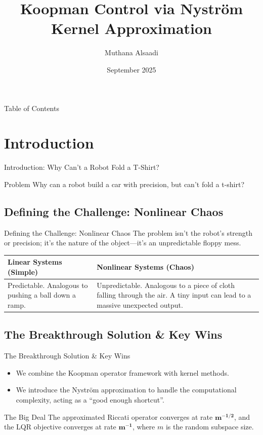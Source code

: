 \documentclass{beamer}
\title{Koopman Control via Nyström Kernel Approximation}
\author{Muthana Alsaadi}
\institute[University of Al-Nahrain]{College of Information Engineering\\University of Al-Nahrain}
\date{September 2025}
\begin{document}
\frame{\titlepage}

\begin{frame}[allowframebreaks]{Table of Contents}
  \tableofcontents
\end{frame}

\section{Introduction}

\begin{frame}{Introduction: Why Can't a Robot Fold a T-Shirt?}
\begin{block}{Problem}
Why can a robot build a car with precision, but can't fold a t-shirt?
\end{block}
\end{frame}

\subsection{Defining the Challenge: Nonlinear Chaos}

\begin{frame}{Defining the Challenge: Nonlinear Chaos}
The problem isn't the robot's strength or precision; it's the nature of the object—it's an unpredictable floppy mess.

\bigskip
\begin{tabular}{|p{4cm}|p{6cm}|}
\hline
Linear Systems (Simple) & Nonlinear Systems (Chaos) \\ \hline
Predictable. Analogous to pushing a ball down a ramp.
& Unpredictable. Analogous to a piece of cloth falling through the air. A tiny input can lead to a massive unexpected output. \\ \hline
\end{tabular}
\end{frame}

\subsection{The Breakthrough Solution \& Key Wins}
\begin{frame}{The Breakthrough Solution \& Key Wins}
\begin{itemize}
  \item We combine the Koopman operator framework with kernel methods.
  \item We introduce the Nyström approximation to handle the computational complexity, acting as a ``good enough shortcut''.
\end{itemize}
\begin{block}{The Big Deal}
The approximated Riccati operator converges at rate $\mathbf{m^{-1/2}}$, and the LQR objective converges at rate $\mathbf{m^{-1}}$, where $m$ is the random subspace size.
\end{block}
\end{frame}
\end{document}

